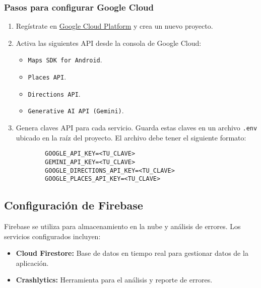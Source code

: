 \subsubsection{Pasos para configurar Google Cloud}
\begin{enumerate}
	\item Regístrate en \href{https://cloud.google.com/}{Google Cloud Platform} y crea un nuevo proyecto.
	\item Activa las siguientes API desde la consola de Google Cloud:
	\begin{itemize}
		\item \texttt{Maps SDK for Android}.
		\item \texttt{Places API}.
		\item \texttt{Directions API}.
		\item \texttt{Generative AI API (Gemini)}.
	\end{itemize}
	\item Genera claves API para cada servicio. Guarda estas claves en un archivo \texttt{.env} ubicado en la raíz del proyecto. El archivo debe tener el siguiente formato:
	\begin{verbatim}
		GOOGLE_API_KEY=<TU_CLAVE>
		GEMINI_API_KEY=<TU_CLAVE>
		GOOGLE_DIRECTIONS_API_KEY=<TU_CLAVE>
		GOOGLE_PLACES_API_KEY=<TU_CLAVE>
	\end{verbatim}
\end{enumerate}

\subsection{Configuración de Firebase}

Firebase se utiliza para almacenamiento en la nube y análisis de errores. Los servicios configurados incluyen:
\begin{itemize}
	\item \textbf{Cloud Firestore:} Base de datos en tiempo real para gestionar datos de la aplicación.
	\item \textbf{Crashlytics:} Herramienta para el análisis y reporte de errores.
\end{itemize}

